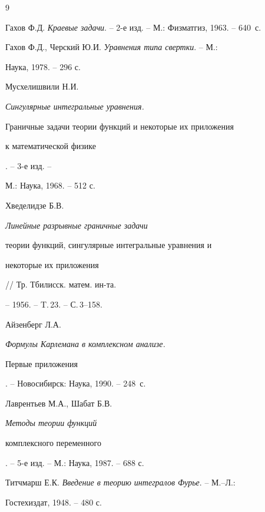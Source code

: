 \begin{thebibliography}{9}







Гахов Ф.Д. {\em Краевые задачи}. -- 2-е изд. -- М.: Физматгиз, 1963. -- 640~с.




Гахов Ф.Д., Черский Ю.И. {\em Уравнения типа свертки}. -- М.: 


Наука, 1978. -- 296 с.




Мусхелишвили Н.И. {\em Сингулярные интегральные уравнения.


Граничные задачи теории функций и некоторые их приложения


к математической физике}. -- 3-е изд. --


М.: Наука, 1968. -- 512 с.




Хведелидзе Б.В. {\em Линейные разрывные граничные задачи


теории функций, сингулярные интегральные уравнения и


некоторые их приложения} // Тр. Тбилисск. матем. ин-та.


-- 1956. -- T.\,23. -- С.\,3--158.




Айзенберг Л.А. {\em Формулы Карлемана в комплексном анализе.


Первые приложения}. -- Новосибирск: Наука, 1990. -- 248~с.




Лаврентьев М.А., Шабат Б.В. {\em Методы теории функций


комплексного переменного}. -- 5-е изд. -- М.: Наука, 1987. -- 688 с.




Титчмарш Е.К. {\em Введение в теорию интегралов Фурье}. -- М.--Л.:


Гостехиздат, 1948. -- 480 с.





\end{thebibliography}





\vskip 2cm














\label{end}






